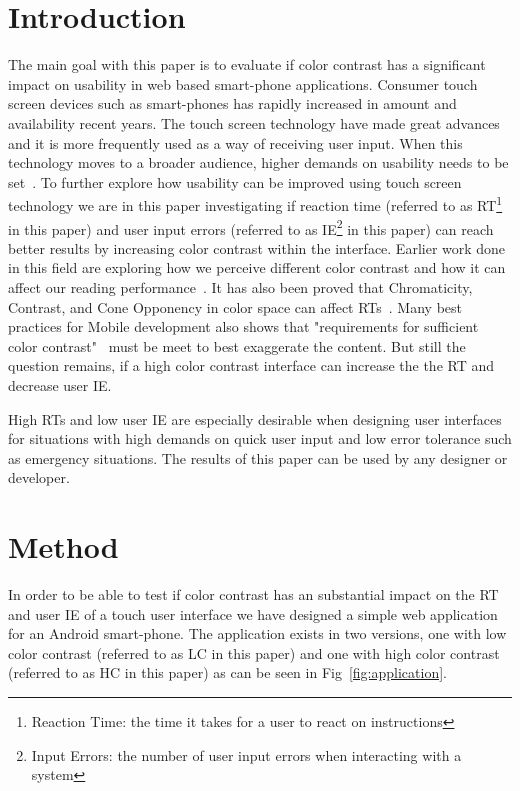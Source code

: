 \documentclass[runningheads,a4paper]{llncs}
\begin{document}
\section{Introduction}
The main goal with this paper is to evaluate if color contrast has a significant impact on usability in web based smart-phone applications. Consumer touch screen devices such as smart-phones has rapidly increased in amount and availability recent years. The touch screen technology have made great advances ~\cite{jennings2013touch} and it is more frequently used as a way of receiving user input. When this technology moves to a broader audience, higher demands on usability needs to be set~\cite{gong2004guidelines}. To further explore how usability can be improved using touch screen technology we are in this paper investigating if reaction time (referred to as RT\footnote{Reaction Time: the time it takes for a user to react on instructions} in this paper) and user input errors (referred to as IE\footnote{Input Errors: the number of user input errors when interacting with a system} in this paper) can reach better results by increasing color contrast within the interface. Earlier work done in this field are exploring how we perceive different color contrast and how it can affect our reading performance~\cite{wu2003improving}. It has also been proved that Chromaticity, Contrast, and Cone Opponency in color space can affect RTs~\cite{mckeefry2003simple}. Many best practices for Mobile development also shows that "requirements for sufficient color contrast"~\cite{marcus2013design} must be meet to best exaggerate the content. But still the question remains, if a high color contrast interface can increase the the RT and decrease user IE.

High RTs and low user IE are especially desirable when designing user interfaces for situations with high demands on quick user input and low error tolerance such as emergency situations. The results of this paper can be used by any designer or developer.

\section{Method}
In order to be able to test if color contrast has an substantial impact on the RT and user IE of a touch user interface we have designed a simple web application for an Android smart-phone. The application exists in two versions, one with low color contrast (referred to as LC in this paper) and one with high color contrast (referred to as HC in this paper) as can be seen in Fig~\ref{fig:application}.
\end{document}

